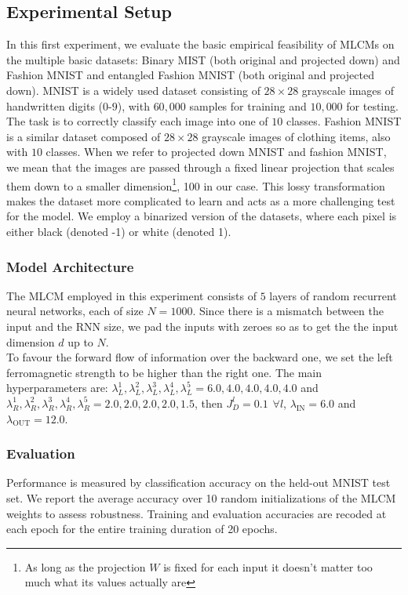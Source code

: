 \documentclass[a4paper,12pt]{report}
\begin{document}
\subsection{Experimental Setup}
In this first experiment, we evaluate the basic empirical feasibility of MLCMs on 
the multiple basic datasets: Binary MIST (both original and projected down) and 
Fashion MNIST and entangled Fashion MNIST (both original and projected down). 
MNIST is a widely used dataset consisting of $28 \times 28$ grayscale images of 
handwritten digits ($0$-$9$), with $60,\!000$ samples for training and $10,\!000$ 
for testing. The task is to correctly classify each image into 
one of $10$ classes. Fashion MNIST is a similar dataset composed of $28 \times 28$ 
grayscale images of clothing items, also with $10$ classes. When we refer to 
projected down MNIST and fashion MNIST, we mean that the images are passed through 
a fixed linear projection that scales them down to a smaller dimension\footnote{
As long as the projection $W$ is fixed for each input it doesn't matter too much what 
its values actually are}, 100 in our 
case. This lossy transformation makes the dataset more complicated to learn and 
acts as a more challenging test for the model. 
We employ a binarized version of the datasets, where each pixel is either black 
(denoted -1) or white (denoted 1).
%
\subsubsection*{Model Architecture}
The MLCM employed in this experiment consists of $5$ layers of random recurrent 
neural networks, each of size $N=1000$. Since there is a mismatch between the 
input and the RNN size, we pad the inputs with zeroes so as to get the 
the input dimension $d$ up to $N$. \\
To favour the forward flow of information over the backward one, we set the left 
ferromagnetic strength to be higher than the right one. The main 
hyperparameters are: $\lambda^1_L, \lambda^2_L, \lambda^3_L, \lambda^4_L, 
\lambda^5_L = 6.0, 4.0, 4.0, 4.0, 4.0$ and $\lambda^1_R, \lambda^2_R, \lambda^3_R, 
\lambda^4_R, \lambda^5_R = 2.0, 2.0, 2.0, 2.0, 1.5$, then $J_D^l = 0.1 \hspace{5pt} 
\forall l$, $\lambda_{\mathrm{IN}} = 6.0$ and $\lambda_{\mathrm{OUT}} = 12.0$.
%
\subsubsection*{Evaluation}
Performance is measured by classification accuracy on the held-out MNIST test set. 
We report the average accuracy over 10 random initializations of the MLCM weights to 
assess robustness. Training and evaluation accuracies are recoded at each epoch 
for the entire training duration of 20 epochs.
%
\end{document}
